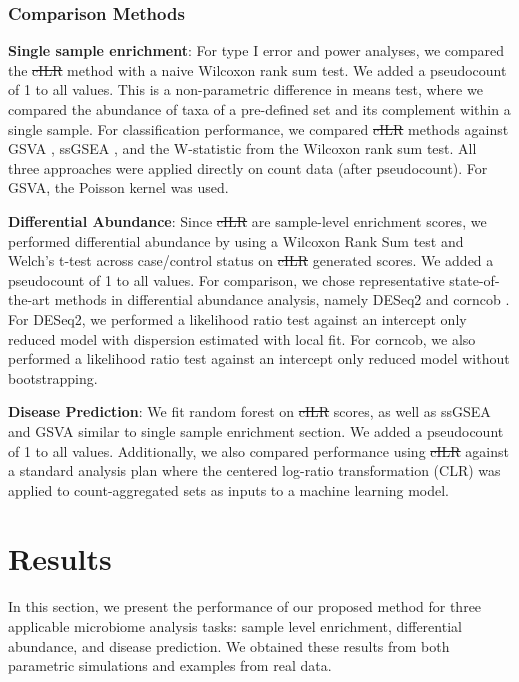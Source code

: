 \documentclass[10pt,letterpaper]{article}
\providecommand{\DIFaddtex}[1]{{\protect\color{blue}\uwave{#1}}} %
\providecommand{\DIFdeltex}[1]{{\protect\color{red}\sout{#1}}}                      %
\providecommand{\DIFaddbegin}{} %
\providecommand{\DIFaddend}{} %
\providecommand{\DIFdelbegin}{} %
\providecommand{\DIFdelend}{} %
\providecommand{\DIFadd}[1]{\texorpdfstring{\DIFaddtex{#1}}{#1}} %
\providecommand{\DIFdel}[1]{\texorpdfstring{\DIFdeltex{#1}}{}} %
\newcommand{\DIFscaledelfig}{0.5}
\newlength{\DIFdelgraphicswidth} %
\newlength{\DIFdelgraphicsheight} %
\newcommand{\DIFaddincludegraphics}[2][]{{\color{blue}\fbox{\DIFOincludegraphics[#1]{#2}}}} %
\newcommand{\DIFdelincludegraphics}[2][]{%
\sbox{\DIFdelgraphicsbox}{\DIFOincludegraphics[#1]{#2}}%
\settoboxwidth{\DIFdelgraphicswidth}{\DIFdelgraphicsbox} %
\settoboxtotalheight{\DIFdelgraphicsheight}{\DIFdelgraphicsbox} %
\scalebox{\DIFscaledelfig}{%
\parbox[b]{\DIFdelgraphicswidth}{\usebox{\DIFdelgraphicsbox}\\[-\baselineskip] \rule{\DIFdelgraphicswidth}{0em}}\llap{\resizebox{\DIFdelgraphicswidth}{\DIFdelgraphicsheight}{%
\setlength{\unitlength}{\DIFdelgraphicswidth}%
\begin{picture}(1,1)%
\thicklines\linethickness{2pt} %
{\color[rgb]{1,0,0}\put(0,0){\framebox(1,1){}}}%
{\color[rgb]{1,0,0}\put(0,0){\line( 1,1){1}}}%
{\color[rgb]{1,0,0}\put(0,1){\line(1,-1){1}}}%
\end{picture}%
}\hspace*{3pt}}} %
} %
\DeclareRobustCommand{\DIFaddbegin}{\DIFOaddbegin \let\includegraphics\DIFaddincludegraphics} %
\DeclareRobustCommand{\DIFaddend}{\DIFOaddend \let\includegraphics\DIFOincludegraphics} %
\DeclareRobustCommand{\DIFdelbegin}{\DIFOdelbegin \let\includegraphics\DIFdelincludegraphics} %
\DeclareRobustCommand{\DIFdelend}{\DIFOaddend \let\includegraphics\DIFOincludegraphics} %
\begin{document}
\subsubsection*{Comparison Methods}

\noindent \textbf{Single sample enrichment}: For type I error and power analyses, we compared the \DIFdelbegin \DIFdel{cILR }\DIFdelend \DIFaddbegin \DIFadd{CBEA }\DIFaddend method with a naive Wilcoxon rank sum test. We added a pseudocount of 1 to all values. This is a non-parametric difference in means test, where we compared the abundance of taxa of a pre-defined set and its complement within a single sample. For classification performance, we compared \DIFdelbegin \DIFdel{cILR }\DIFdelend \DIFaddbegin \DIFadd{CBEA }\DIFaddend methods against GSVA \cite{hanzelmann2013}, ssGSEA \cite{barbie2009}, and the W-statistic from the Wilcoxon rank sum test. All three approaches were applied directly on count data (after pseudocount). For GSVA, the Poisson kernel was used. 

\noindent \textbf{Differential Abundance}: Since \DIFdelbegin \DIFdel{cILR }\DIFdelend \DIFaddbegin \DIFadd{CBEA }\DIFaddend are sample-level enrichment scores, we performed differential abundance by using a Wilcoxon Rank Sum test and Welch's t-test across case/control status on \DIFdelbegin \DIFdel{cILR }\DIFdelend \DIFaddbegin \DIFadd{CBEA }\DIFaddend generated scores. We added a pseudocount of 1 to all values. For comparison, we chose representative state-of-the-art methods in differential abundance analysis, namely DESeq2 \cite{love2014,mcmurdie2014} and corncob \cite{martin2020}. For DESeq2, we performed a likelihood ratio test against an intercept only reduced model with dispersion estimated with local fit. For corncob, we also performed a likelihood ratio test against an intercept only reduced model without bootstrapping. 

\noindent \textbf{Disease Prediction}: We fit random forest on \DIFdelbegin \DIFdel{cILR }\DIFdelend \DIFaddbegin \DIFadd{CBEA }\DIFaddend scores, as well as ssGSEA \cite{hanzelmann2013} and GSVA \cite{barbie2009} similar to single sample enrichment section. We added a pseudocount of 1 to all values. Additionally, we also compared performance using \DIFdelbegin \DIFdel{cILR }\DIFdelend \DIFaddbegin \DIFadd{CBEA }\DIFaddend against a standard analysis plan where the centered log-ratio transformation (CLR) was applied to count-aggregated sets as inputs to a machine learning model. 

\section*{Results}
In this section, we present the performance of our proposed method for three applicable microbiome analysis tasks: sample level enrichment, differential abundance, and disease prediction. We obtained these results from both parametric simulations and examples from real data.  
\end{document}
